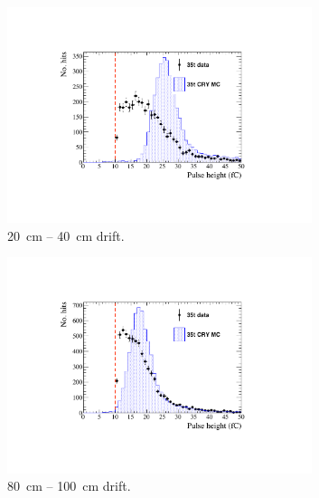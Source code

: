 \begin{figure}
  \centering
  \begin{subfigure}[t]{0.32\linewidth}
    \centering
    \includegraphics[width=0.98\textwidth]{HitReconstructionBias20-40.pdf}
    \caption{20~cm -- 40~cm drift.}
    \label{fig:DataCalorimetryThreshold1}
  \end{subfigure}
  \hfill
  \begin{subfigure}[t]{0.32\linewidth}
    \centering
    \includegraphics[width=0.98\textwidth]{HitReconstructionBias80-100.pdf}
    \caption{80~cm -- 100~cm drift.}
    \label{fig:DataCalorimetryThreshold2}
  \end{subfigure}
  \hfill
  \begin{subfigure}[t]{0.32\linewidth}
    \centering

\end{subfigure}
\end{figure}

